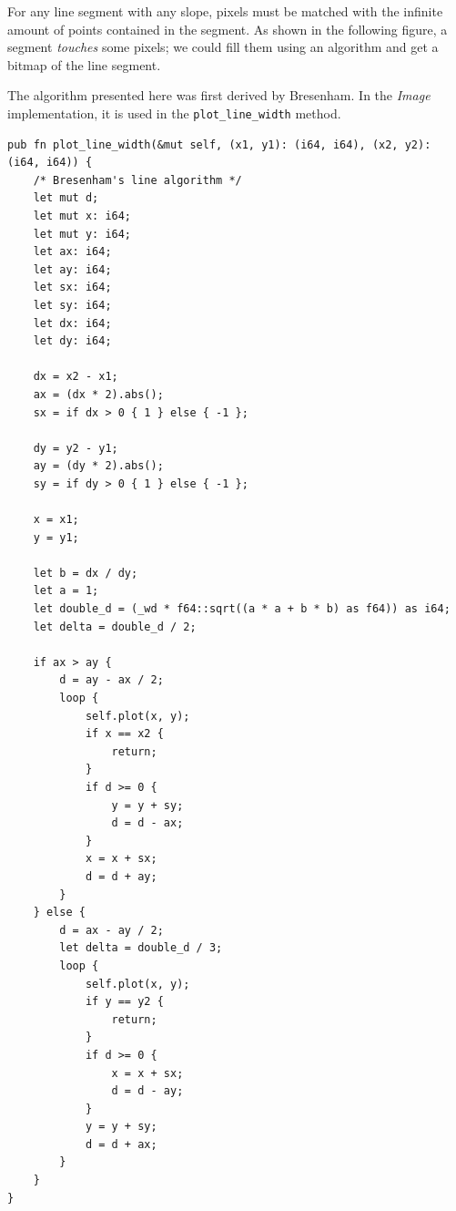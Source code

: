 \documentclass[12pt,openany,a4,usenames,dvipsnames]{book}
\newcommand\bitmap{{\pixelfont{}bitmap}}
\newcommand\pixels{{\pixelfont{}pixels}}
\begin{document}
For any line segment with any slope, \pixels{} must be matched with the infinite
amount of points contained in the segment. As shown in the following figure, a segment \emph{touches} some \pixels{}; we could fill them using an algorithm and get a \bitmap{} of the line segment.

\begin{figure}[H]
\centering

\end{figure}

The algorithm presented here was first derived by Bresenham. In the \emph{Image} implementation, it is used in the \texttt{plot\_line\_width} method.
\begin{verbatim}
pub fn plot_line_width(&mut self, (x1, y1): (i64, i64), (x2, y2): (i64, i64)) {
    /* Bresenham's line algorithm */
    let mut d;
    let mut x: i64;
    let mut y: i64;
    let ax: i64;
    let ay: i64;
    let sx: i64;
    let sy: i64;
    let dx: i64;
    let dy: i64;

    dx = x2 - x1;
    ax = (dx * 2).abs();
    sx = if dx > 0 { 1 } else { -1 };

    dy = y2 - y1;
    ay = (dy * 2).abs();
    sy = if dy > 0 { 1 } else { -1 };

    x = x1;
    y = y1;

    let b = dx / dy;
    let a = 1;
    let double_d = (_wd * f64::sqrt((a * a + b * b) as f64)) as i64;
    let delta = double_d / 2;

    if ax > ay {
        d = ay - ax / 2;
        loop {
            self.plot(x, y);
            if x == x2 {
                return;
            }
            if d >= 0 {
                y = y + sy;
                d = d - ax;
            }
            x = x + sx;
            d = d + ay;
        }
    } else {
        d = ax - ay / 2;
        let delta = double_d / 3;
        loop {
            self.plot(x, y);
            if y == y2 {
                return;
            }
            if d >= 0 {
                x = x + sx;
                d = d - ay;
            }
            y = y + sy;
            d = d + ax;
        }
    }
}
\end{verbatim}
\end{document}
